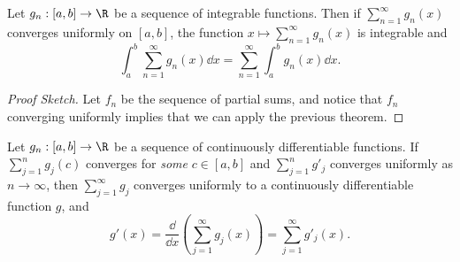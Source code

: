\begin{theorem}
    Let $g_n: [a, b] \rightarrow \R$ be a sequence of integrable functions. Then if $\sum_{n = 1}^{\infty} g_n(x)$ converges uniformly on $[a, b]$, the function $x \mapsto \sum_{n = 1}^{\infty} g_n(x)$ is integrable and
    $$
    \int_a^b \sum_{n = 1}^{\infty} g_n(x) \dd x = \sum_{n = 1}^{\infty} \int_a^b g_n(x) \dd x.
    $$
\end{theorem}
\begin{proof}[Proof Sketch]
    Let $f_n$ be the sequence of partial sums, and notice that $f_n$ converging uniformly implies that we can apply the previous theorem.
\end{proof}

\begin{theorem}
    Let $g_n: [a, b] \rightarrow \R$ be a sequence of continuously differentiable functions. If $\sum_{j = 1}^n g_j(c)$ converges for \emph{some} $c \in [a, b]$ and $\sum_{j = 1}^n g'_j$ converges uniformly as $n \rightarrow \infty$, then $\sum_{j = 1}^{\infty} g_j$ converges uniformly to a continuously differentiable function $g$, and
    $$
   g'(x) = \frac{\dd}{\dd x} \left(\sum_{j = 1}^{\infty} g_j(x)\right) = \sum_{j = 1}^{\infty} g'_j(x).
    $$
\end{theorem}
